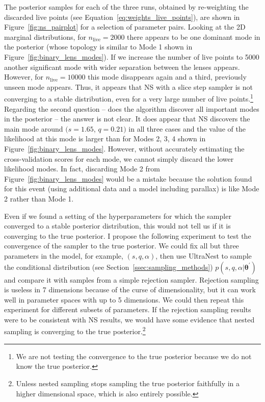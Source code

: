\documentclass[12pt,dvipsnames]{report}
\newcommand{\ssf}[1]{\textsf{#1}}
\renewcommand{\vec}[1]{\boldsymbol{\mathbf{#1}}}
\begin{document}
The posterior samples for each of the three runs, obtained by re-weighting the discarded
live points (see Equation~\ref{eq:weights_live_points}), are shown in 
Figure~\ref{fig:ns_pairplot} for a selection of parameter pairs. Looking at the 2D marginal 
distributions, for $n_\mathrm{live}=2000$ there appears to be one dominant mode in the 
posterior (whose topology is similar to Mode 1 shown in Figure~\ref{fig:binary_lens_modes}).
If we increase the number of live points to 5000 another significant mode with wider separation
between the lenses appears. However, for $n_\mathrm{live}=10000$ this mode disappears again 
and a third, previously unseen mode appears. Thus, it appears that NS with a slice step sampler 
is not converging to a stable distribution, even for a very large number of live points.\footnote{We are not testing the convergence 
to the true posterior because we do not know the true posterior.}
Regarding the second question -- does the algorithm discover all important modes in the
posterior -- the answer is not clear. It does appear that NS discovers the main mode around 
$(s=1.65$, $q=0.21)$ in all three cases and the value of the likelihood 
at this mode is larger than for Modes 2, 3, 4  shown in Figure~\ref{fig:binary_lens_modes}.
However, without accurately estimating the cross-validation scores for each mode, we 
cannot simply discard the lower likelihood modes. In fact, discarding Mode 2 from 
Figure~\ref{fig:binary_lens_modes} would be a mistake because the solution 
 \citet{2018ApJ...867..136H} found for this event (using additional data and a model 
 including parallax) is like Mode 2 rather than Mode 1.


Even if we found a setting of the hyperparameters for which the sampler converged to a 
stable posterior distribution, this would not tell us if it is converging to the true posterior. 
I propose the following experiment to test the convergence of the sampler to the true posterior.
We could fix all but three parameters in the model, for example, $(s, q, \alpha)$, 
then use \ssf{UltraNest} to sample the conditional distribution 
(see Section~\ref{ssec:sampling_methods}) 
$p(s,q,\alpha|\vec\theta^\prime)$ and compare it with samples from a simple rejection 
sampler. Rejection sampling is useless in 7 dimensions because of the curse of dimensionality,
but it can work well in parameter spaces with up to 5 dimensions. We could then repeat this
experiment for different subsets of parameters. If the rejection sampling results were to be  
consistent with NS results, we would have some evidence that nested sampling 
is converging to the true posterior.\footnote{Unless nested sampling stops sampling the true posterior
faithfully in a higher dimensional space, which is also entirely possible.}
\end{document}
